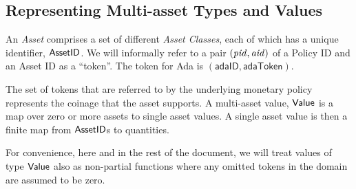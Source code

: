 \subsection*{Representing Multi-asset Types and Values}
An \emph{Asset} comprises a set of different \emph{Asset Classes}, each of which has
a unique identifier, $\mathsf{AssetID}$. We will informally refer to a pair $(\mathit{pid}, \mathit{aid})$ of a Policy ID and an Asset ID as a ``token''. The token for Ada is $(\mathsf{adaID}, \mathsf{adaToken})$.

The set of tokens that are referred to by the underlying monetary policy represents the coinage that the asset supports.  A multi-asset value, $\mathsf{Value}$ is a map over zero or more assets
to single asset values.  A single asset value is then a finite map from
$\mathsf{AssetID}$s to quantities.

For convenience, here and in the rest of the document, we
will treat values of type $\mathsf{Value}$ also as non-partial functions where
any omitted tokens in the domain are assumed to be zero.

